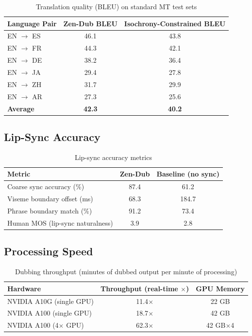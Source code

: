 \documentclass[11pt,a4paper]{article}
\begin{document}
\begin{table}[H]
\centering
\caption{Translation quality (BLEU) on standard MT test sets}
\begin{tabular}{lcc}
\toprule
\textbf{Language Pair} & \textbf{Zen-Dub BLEU} & \textbf{Isochrony-Constrained BLEU} \\
\midrule
EN $\to$ ES  & 46.1 & 43.8 \\
EN $\to$ FR  & 44.3 & 42.1 \\
EN $\to$ DE  & 38.2 & 36.4 \\
EN $\to$ JA  & 29.4 & 27.8 \\
EN $\to$ ZH  & 31.7 & 29.9 \\
EN $\to$ AR  & 27.3 & 25.6 \\
\textbf{Average} & \textbf{42.3} & \textbf{40.2} \\
\bottomrule
\end{tabular}
\label{tab:bleu}
\end{table}

\subsection{Lip-Sync Accuracy}

\begin{table}[H]
\centering
\caption{Lip-sync accuracy metrics}
\begin{tabular}{lcc}
\toprule
\textbf{Metric} & \textbf{Zen-Dub} & \textbf{Baseline (no sync)} \\
\midrule
Coarse sync accuracy (\%)    & 87.4 & 61.2 \\
Viseme boundary offset (ms)  & 68.3 & 184.7 \\
Phrase boundary match (\%)   & 91.2 & 73.4 \\
Human MOS (lip-sync naturalness) & 3.9 & 2.8 \\
\bottomrule
\end{tabular}
\label{tab:sync}
\end{table}

\subsection{Processing Speed}

\begin{table}[H]
\centering
\caption{Dubbing throughput (minutes of dubbed output per minute of processing)}
\begin{tabular}{lcc}
\toprule
\textbf{Hardware} & \textbf{Throughput (real-time $\times$)} & \textbf{GPU Memory} \\
\midrule
NVIDIA A10G (single GPU)  & 11.4$\times$ & 22 GB \\
NVIDIA A100 (single GPU)  & 18.7$\times$ & 42 GB \\
NVIDIA A100 (4$\times$ GPU) & 62.3$\times$ & 42 GB$\times$4 \\
\bottomrule
\end{tabular}
\label{tab:speed}
\end{table}
\end{document}
